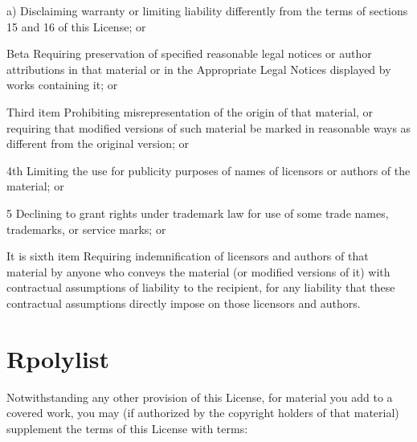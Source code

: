 \documentclass{article}
\begin{document}
\begin{Lpolylist}[fourth]

\item[a)] Disclaiming warranty or limiting liability differently from the terms of sections 15 and 16 of this License; or

\item[Beta] Requiring preservation of specified reasonable legal notices or author attributions in that material or in the Appropriate Legal Notices displayed by works containing it; or

\item[Third item] Prohibiting misrepresentation of the origin of that material, or requiring that modified versions of such material be marked in reasonable ways as different from the original version; or

\item[4th] Limiting the use for publicity purposes of names of licensors or authors of the material; or

\item[5] Declining to grant rights under trademark law for use of some trade names, trademarks, or service marks; or

\item[It is sixth item] Requiring indemnification of licensors and authors of that material by anyone who conveys the material (or modified versions of it) with contractual assumptions of liability to the recipient, for any liability that these contractual assumptions directly impose on those licensors and authors.

\end{Lpolylist}

\section{Rpolylist}

Notwithstanding any other provision of this License, for material you add to a covered work, you may (if authorized by the copyright holders of that material) supplement the terms of this License with terms:
\end{document}
